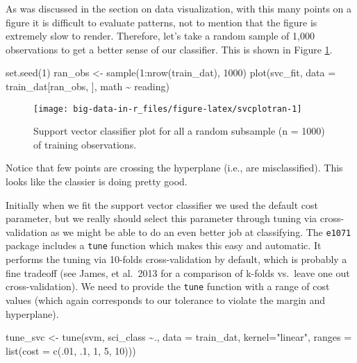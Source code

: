 \documentclass[
]{book}
\newenvironment{Shaded}{\begin{snugshade}}{\end{snugshade}}
\newcommand{\AttributeTok}[1]{\textcolor[rgb]{0.77,0.63,0.00}{#1}}
\newcommand{\DecValTok}[1]{\textcolor[rgb]{0.00,0.00,0.81}{#1}}
\newcommand{\FunctionTok}[1]{\textcolor[rgb]{0.00,0.00,0.00}{#1}}
\newcommand{\NormalTok}[1]{#1}
\newcommand{\OtherTok}[1]{\textcolor[rgb]{0.56,0.35,0.01}{#1}}
\newcommand{\SpecialCharTok}[1]{\textcolor[rgb]{0.00,0.00,0.00}{#1}}
\newcommand{\StringTok}[1]{\textcolor[rgb]{0.31,0.60,0.02}{#1}}
\begin{document}
As was discussed in the section on data visualization, with this many points on a figure it is difficult to evaluate patterns, not to mention that the figure is extremely slow to render. Therefore, let's take a random sample of 1,000 observations to get a better sense of our classifier. This is shown in Figure \ref{fig:svcplotran}.

\begin{Shaded}
\begin{Highlighting}[]
\FunctionTok{set.seed}\NormalTok{(}\DecValTok{1}\NormalTok{)}
\NormalTok{ran\_obs }\OtherTok{\textless{}{-}} \FunctionTok{sample}\NormalTok{(}\DecValTok{1}\SpecialCharTok{:}\FunctionTok{nrow}\NormalTok{(train\_dat), }\DecValTok{1000}\NormalTok{)}
\FunctionTok{plot}\NormalTok{(svc\_fit, }\AttributeTok{data =}\NormalTok{ train\_dat[ran\_obs, ], math }\SpecialCharTok{\textasciitilde{}}\NormalTok{ reading)}
\end{Highlighting}
\end{Shaded}

\begin{figure}
\texttt{[image: big-data-in-r\_files/figure-latex/svcplotran-1]} \caption{Support vector classifier plot for all a random subsample (n = 1000) of training observations.}\label{fig:svcplotran}
\end{figure}

Notice that few points are crossing the hyperplane (i.e., are misclassified). This looks like the classier is doing pretty good.

Initially when we fit the support vector classifier we used the default cost parameter, but we really should select this parameter through tuning via cross-validation as we might be able to do an even better job at classifying. The \texttt{e1071} package includes a \texttt{tune} function which makes this easy and automatic. It performs the tuning via 10-folds cross-validation by default, which is probably a fine tradeoff (see James, et al.~2013 for a comparison of k-folds vs.~leave one out cross-validation). We need to provide the \texttt{tune} function with a range of cost values (which again corresponds to our tolerance to violate the margin and hyperplane).

\begin{Shaded}
\begin{Highlighting}[]
\NormalTok{tune\_svc }\OtherTok{\textless{}{-}} \FunctionTok{tune}\NormalTok{(svm, sci\_class }\SpecialCharTok{\textasciitilde{}}\NormalTok{., }\AttributeTok{data =}\NormalTok{ train\_dat,}
                 \AttributeTok{kernel=}\StringTok{"linear"}\NormalTok{,}
                 \AttributeTok{ranges =} \FunctionTok{list}\NormalTok{(}\AttributeTok{cost =} \FunctionTok{c}\NormalTok{(.}\DecValTok{01}\NormalTok{, .}\DecValTok{1}\NormalTok{, }\DecValTok{1}\NormalTok{, }\DecValTok{5}\NormalTok{, }\DecValTok{10}\NormalTok{)))}
\end{Highlighting}
\end{Shaded}
\end{document}
